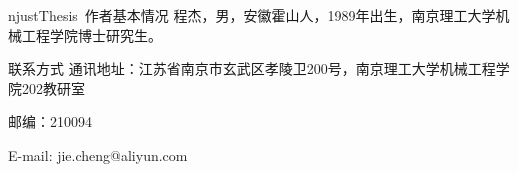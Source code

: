 
\begin{resume}

\begin{resumesection}{njustThesis~作者基本情况}
程杰，男，安徽霍山人，1989年出生，南京理工大学机械工程学院博士研究生。
\end{resumesection}

\begin{resumelist}{联系方式}
通讯地址：江苏省南京市玄武区孝陵卫200号，南京理工大学机械工程学院202教研室

邮编：210094

E-mail: jie.cheng@aliyun.com
\end{resumelist}

\end{resume}
